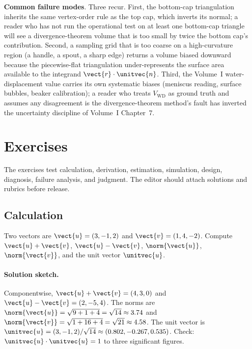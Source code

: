 \begin{project}
\textbf{Common failure modes}. Three recur. First, the bottom-cap
triangulation inherits the same vertex-order rule as the top cap,
which inverts its normal; a reader who has not run the operational
test on at least one bottom-cap triangle will see a divergence-theorem
volume that is too small by twice the bottom cap's contribution.
Second, a sampling grid that is too coarse on a high-curvature region
(a handle, a spout, a sharp edge) returns a volume biased downward
because the piecewise-flat triangulation under-represents the surface
area available to the integrand $\vect{r}\cdot\unitvec{n}$. Third, the
Volume~I water-displacement value carries its own systematic biases
(meniscus reading, surface bubbles, beaker calibration); a reader
who treats $V_{\text{WD}}$ as ground truth and assumes any
disagreement is the divergence-theorem method's fault has inverted
the uncertainty discipline of Volume~I Chapter~7.
\end{project}

\section{Exercises}

The exercises test calculation, derivation, estimation, simulation,
design, diagnosis, failure analysis, and judgment. The editor
should attach solutions and rubrics before release.

\subsection*{Calculation}

\begin{exercise}
Two vectors are $\vect{u} = (3, -1, 2)$ and $\vect{v} = (1, 4, -2)$.
Compute $\vect{u} + \vect{v}$, $\vect{u} - \vect{v}$,
$\norm{\vect{u}}$, $\norm{\vect{v}}$, and the unit vector
$\unitvec{u}$.

\paragraph{Solution sketch.} Componentwise, $\vect{u} + \vect{v} =
(4, 3, 0)$ and $\vect{u} - \vect{v} = (2, -5, 4)$. The norms are
$\norm{\vect{u}} = \sqrt{9 + 1 + 4} = \sqrt{14} \approx 3.74$ and
$\norm{\vect{v}} = \sqrt{1 + 16 + 4} = \sqrt{21} \approx 4.58$. The
unit vector is $\unitvec{u} = (3, -1, 2)/\sqrt{14} \approx
(0.802, -0.267, 0.535)$. Check: $\unitvec{u}\cdot\unitvec{u} = 1$
to three significant figures.
\end{exercise}

